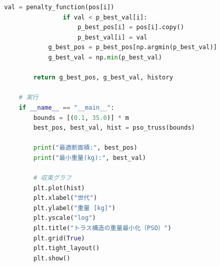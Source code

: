 \begin{lstlisting}[language=Python, caption=PSOによるトラス構造の最適設計, label=lst:kadai7_code]
                val = penalty_function(pos[i])
                if val < p_best_val[i]:
                    p_best_pos[i] = pos[i].copy()
                    p_best_val[i] = val
            g_best_pos = p_best_pos[np.argmin(p_best_val)]
            g_best_val = np.min(p_best_val)
        
        return g_best_pos, g_best_val, history
    
    # 実行
    if __name__ == "__main__":
        bounds = [(0.1, 35.0)] * m
        best_pos, best_val, hist = pso_truss(bounds)
    
        print("最適断面積:", best_pos)
        print("最小重量(kg):", best_val)
    
        # 収束グラフ
        plt.plot(hist)
        plt.xlabel("世代")
        plt.ylabel("重量 [kg]")
        plt.yscale("log")
        plt.title("トラス構造の重量最小化（PSO）")
        plt.grid(True)
        plt.tight_layout()
        plt.show()
    
\end{lstlisting}
